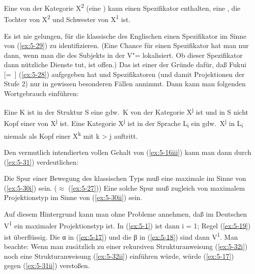 \documentclass[output=paper]{LSP/langsci}
\begin{document}
\begin{exe}
\ex%
\label{ex:5-29}
Eine  von der Kategorie X\textsuperscript{2} (eine ) kann einen Spezifikator enthalten, \dash eine , die Tochter von X\textsuperscript{2} und Schwester von X\textsuperscript{1} ist.
\end{exe}
Es ist nie gelungen, für die klassische  des Englischen einen Spezifikator im Sinne von (\ref{ex:5-29}) zu identifizieren. (Eine Chance für einen Spezifikator hat man nur dann, wenn man die  des Subjekts in der V"= lokalisiert. Ob dieser Spezifikator dann nützliche Dienste tut, ist offen.) Das ist einer der Gründe dafür, daß Fukui\label{proj-eckig2} [=~\citet{Fukui1986}] (\ref{ex:5-28}) aufgegeben hat und Spezifikatoren (und damit Projektionen der Stufe 2) nur in gewissen besonderen Fällen annimmt. Dann kann man folgenden Wortgebrauch einführen:

\begin{exe}
\ex%
\label{ex:5-30}
\begin{xlisti}
\ex%
\label{ex:5-30i}
Eine  K ist in der Struktur S eine 
gdw.\ K von der Kategorie X\textsuperscript{j} ist und in S nicht Kopf
einer  von X\textsuperscript{j} ist.
\ex%
\label{ex:5-30ii}
Eine Kategorie X\textsuperscript{j} ist in der Sprache
L\textsubscript{i} ein 
gdw.\ X\textsuperscript{j} in L\textsubscript{i} niemals als Kopf einer
 X\textsuperscript{k} mit k {\textgreater} j auftritt.
\end{xlisti}
\end{exe}
Den vermutlich intendierten vollen Gehalt von (\ref{ex:5-16iii}) kann man dann durch (\ref{ex:5-31}) verdeutlichen:
\begin{exe}
\ex%
\label{ex:5-31}
\begin{xlisti}
\ex%
\label{ex:5-31i}
Die Spur einer Bewegung des klassischen Typs muß eine maximale
 im Sinne von (\ref{ex:5-30i}) sein. (${\approx}$ (\ref{ex:5-27}))
\ex%
\label{ex:5-31ii}
Eine solche Spur muß zugleich von maximalem Projektionstyp
im Sinne von (\ref{ex:5-30ii}) sein.
\end{xlisti}
\end{exe}
Auf diesem Hintergrund kann man ohne Probleme annehmen, daß im
Deutschen V\textsuperscript{1} ein maximaler Projektionstyp ist. In
(\ref{ex:5-1}) ist dann i = 1; Regel (\ref{ex:5-19}) ist überflüssig. Die α in (\ref{ex:5-17})
und die β in (\ref{ex:5-18}) sind dann V\textsuperscript{1}. Man beachte:
Wenn man zusätzlich zu einer rekursiven Strukturanweisung (\ref{ex:5-32i}) noch
eine Strukturanweisung (\ref{ex:5-32ii}) einführen würde, würde (\ref{ex:5-17}) gegen (\ref{ex:5-31ii})
verstoßen.
\end{document}
